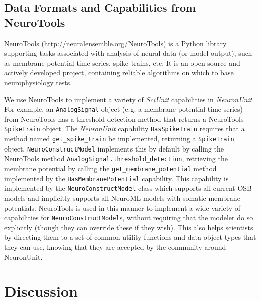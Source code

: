 \documentclass{frontiersSCNS}
\let\verbx\lstinline
\begin{document}
\subsection{Data Formats and Capabilities from NeuroTools}\label{sec:neurotools}
NeuroTools (\url{http://neuralensemble.org/NeuroTools}) is a Python library supporting tasks associated with analysis of neural data (or model output), such as membrane potential time series, spike trains, etc. 
It is an open source and actively developed project, containing reliable algorithms on which to base neurophysiology tests.

We use NeuroTools to implement a variety of \textit{SciUnit} capabilities in \textit{NeuronUnit}. 
For example, an \verbx{AnalogSignal} object (e.g. a membrane potential time series) from NeuroTools has a threshold detection method that returns a NeuroTools \verbx{SpikeTrain} object. 
The \textit{NeuronUnit} capability \verbx{HasSpikeTrain}  requires that a method named \verbx{get_spike_train} be implemented, returning a \verbx{SpikeTrain} object. 
\verbx{NeuroConstructModel} implements this by default by calling the NeuroTools method \verbx{AnalogSignal.threshold_detection}, retrieving the membrane potential by calling the \verbx{get_membrane_potential} method implemented by the \verbx{HasMembranePotential} capability. 
This capability is implemented by the \verbx{NeuroConstructModel} class which supports all current OSB models and implicitly supports all NeuroML models with somatic membrane potentials.
NeuroTools is used in this manner to implement a wide variety of capabilities for \verbx{NeuroConstructModel}s, without requiring that the modeler do so explicitly (though they can override these if they wish). 
This also helps scientists by directing them to a set of common utility functions and data object types that they can use, knowing that they are accepted by the community around NeuronUnit.

\section{Discussion}\label{sec:discussion}
\end{document}
